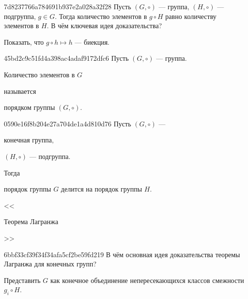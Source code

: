 \begin{note}{7d8237766a784691b937e2a028a32f28}
    Пусть \({ (G, \circ) }\) --- группа, \({ (H, \circ) }\) --- подгруппа,\: \({ g \in G }\).
    Тогда количество элементов в \({ g \circ H }\) равно количеству элементов в \({ H }\).
    В чём ключевая идея доказательства?

    \begin{cloze}{1}
        Показать, что \({ g \circ h \mapsto h }\) --- биекция.
    \end{cloze}
\end{note}

\begin{note}{45bd2c9c51fd4a398ac4adaf9172dfc6}
    Пусть \({ (G, \circ) }\) --- группа.
    \begin{icloze}{1}Количество элементов в \({ G }\)\end{icloze} называется \begin{icloze}{2}порядком группы \({ (G, \circ) }\).\end{icloze}
\end{note}

\begin{note}{0590e16f8b204e27a704de1a4d810d76}
    Пусть \({ (G, \circ) }\) --- \begin{icloze}{3}конечная группа,\end{icloze} \begin{icloze}{2}\({ (H, \circ) }\) --- подгруппа.\end{icloze}
    Тогда \begin{icloze}{1}порядок группы \({ G }\) делится на порядок группы \({ H }\).\end{icloze}

    \begin{center}
        \tiny
        <<\begin{icloze}{4}Теорема Лагранжа\end{icloze}>>
    \end{center}
\end{note}

\begin{note}{6bbf33cf39f34f34afa5cf2be59fd219}
    В чём основная идея доказательства теоремы Лагранжа для конечных групп?

    \begin{cloze}{1}
        Представить \({ G }\) как конечное объединение непересекающихся классов смежности \({ g_i \circ H }\).
    \end{cloze}
\end{note}

